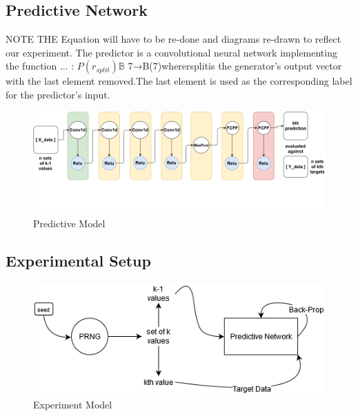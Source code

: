 \documentclass[conference]{IEEEtran}
\begin{document}
\subsection{Predictive Network}
NOTE THE Equation will have to be re-done and diagrams re-drawn to reflect our experiment.
The predictor is a convolutional neural network implementing the function ...
: $P(r_{split}) \mathbb{B}$ 7→B(7)wherersplitis  the  generator’s  output  vector  with  the  last  element  removed.The  last  element  is  used  as  the  corresponding  label  for  the  predictor’s  input.
\begin{figure}[H]
\centering
\includegraphics[width=1\linewidth]{./Images/PredictiveModel.png}
\caption{Predictive Model}
\label{fig:globfig}
\end{figure}

\subsection{Experimental Setup}
\begin{figure}[H]
\centering
\includegraphics[width=1\linewidth]{./Images/SimpleModel.png}
\caption{Experiment Model}
\label{fig:globfig}
\end{figure}
\end{document}
